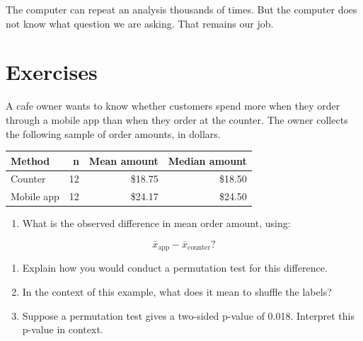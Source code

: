 \documentclass[
  letterpaper,
  DIV=11,
  numbers=noendperiod]{scrreprt}
\providecommand{\tightlist}{%
  \setlength{\itemsep}{0pt}\setlength{\parskip}{0pt}}
\begin{document}
The computer can repeat an analysis thousands of times. But the computer
does not know what question we are asking. That remains our job.

\section{Exercises}\label{exercises-5}

\begin{tcolorbox}[enhanced jigsaw, arc=.35mm, bottomrule=.15mm, bottomtitle=1mm, breakable, colback=white, colbacktitle=quarto-callout-note-color!10!white, colframe=quarto-callout-note-color-frame, coltitle=black, left=2mm, leftrule=.75mm, opacityback=0, opacitybacktitle=0.6, rightrule=.15mm, title=\textcolor{quarto-callout-note-color}{\faInfo}\hspace{0.5em}{Question 1}, titlerule=0mm, toprule=.15mm, toptitle=1mm]

A cafe owner wants to know whether customers spend more when they order
through a mobile app than when they order at the counter. The owner
collects the following sample of order amounts, in dollars.

\begin{table}
\fontsize{12.0pt}{14.0pt}\selectfont
\begin{tabular*}{\linewidth}{@{\extracolsep{\fill}}lrrr}
\toprule
Method & n & Mean amount & Median amount \\ 
\midrule\addlinespace[2.5pt]
Counter & 12 & \$18.75 & \$18.50 \\ 
Mobile app & 12 & \$24.17 & \$24.50 \\ 
\bottomrule
\end{tabular*}
\end{table}

\begin{enumerate}
\def\labelenumi{(\alph{enumi})}
\tightlist
\item
  What is the observed difference in mean order amount, using:
\end{enumerate}

\[\bar{x}_{\text{app}} - \bar{x}_{\text{counter}}?\]

\begin{enumerate}
\def\labelenumi{(\alph{enumi})}
\setcounter{enumi}{1}
\item
  Explain how you would conduct a permutation test for this difference.
\item
  In the context of this example, what does it mean to shuffle the
  labels?
\item
  Suppose a permutation test gives a two-sided p-value of 0.018.
  Interpret this p-value in context.
\end{enumerate}


\end{tcolorbox}
\end{document}
